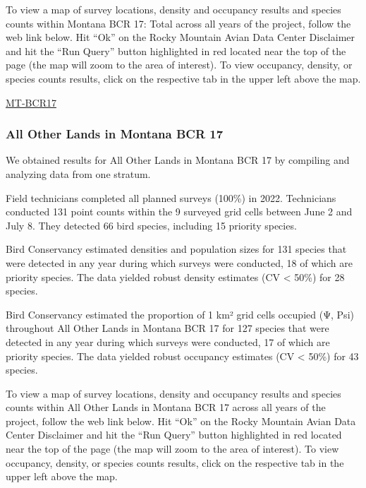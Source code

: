 \documentclass[
  letterpaper,
  DIV=11,
  numbers=noendperiod,
  oneside]{scrreprt}
\begin{document}
To view a map of survey locations, density and occupancy results and
species counts within Montana BCR 17: Total across all years of the
project, follow the web link below. Hit ``Ok'' on the Rocky Mountain
Avian Data Center Disclaimer and hit the ``Run Query'' button
highlighted in red located near the top of the page (the map will zoom
to the area of interest). To view occupancy, density, or species counts
results, click on the respective tab in the upper left above the map.

\href{http://www.rmbo.org/new_site/adc/QueryWindow.aspx\#N4IgzgrgDgpgTmALnAhoiBbEAuABCAWQBUBaAIQGEAlARgHYQBfIA===}{MT-BCR17}

\hypertarget{all-other-lands-in-montana-bcr-17}{%
\subsubsection{All Other Lands in Montana BCR
17}\label{all-other-lands-in-montana-bcr-17}}

We obtained results for All Other Lands in Montana BCR 17 by compiling
and analyzing data from one stratum.

Field technicians completed all planned surveys (100\%) in 2022.
Technicians conducted 131 point counts within the 9 surveyed grid cells
between June 2 and July 8. They detected 66 bird species, including 15
priority species.

Bird Conservancy estimated densities and population sizes for 131
species that were detected in any year during which surveys were
conducted, 18 of which are priority species. The data yielded robust
density estimates (CV \textless{} 50\%) for 28 species.

Bird Conservancy estimated the proportion of 1 km² grid cells occupied
(Ψ, Psi) throughout All Other Lands in Montana BCR 17 for 127 species
that were detected in any year during which surveys were conducted, 17
of which are priority species. The data yielded robust occupancy
estimates (CV \textless{} 50\%) for 43 species.

To view a map of survey locations, density and occupancy results and
species counts within All Other Lands in Montana BCR 17 across all years
of the project, follow the web link below. Hit ``Ok'' on the Rocky
Mountain Avian Data Center Disclaimer and hit the ``Run Query'' button
highlighted in red located near the top of the page (the map will zoom
to the area of interest). To view occupancy, density, or species counts
results, click on the respective tab in the upper left above the map.
\end{document}
